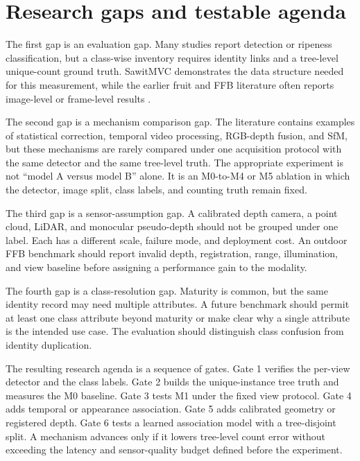 \section{Research gaps and testable agenda}
\label{sec:agenda2}

The first gap is an evaluation gap. Many studies report detection or ripeness classification, but a class-wise inventory requires identity links and a tree-level unique-count ground truth. SawitMVC demonstrates the data structure needed for this measurement, while the earlier fruit and FFB literature often reports image-level or frame-level results \cite{indriani2026sawitmvc,naftali2024palmcounter,koirala2019deepfruit}.

The second gap is a mechanism comparison gap. The literature contains examples of statistical correction, temporal video processing, RGB-depth fusion, and SfM, but these mechanisms are rarely compared under one acquisition protocol with the same detector and the same tree-level truth. The appropriate experiment is not ``model A versus model B'' alone. It is an M0-to-M4 or M5 ablation in which the detector, image split, class labels, and counting truth remain fixed.

The third gap is a sensor-assumption gap. A calibrated depth camera, a point cloud, LiDAR, and monocular pseudo-depth should not be grouped under one label. Each has a different scale, failure mode, and deployment cost. An outdoor FFB benchmark should report invalid depth, registration, range, illumination, and view baseline before assigning a performance gain to the modality.

The fourth gap is a class-resolution gap. Maturity is common, but the same identity record may need multiple attributes. A future benchmark should permit at least one class attribute beyond maturity or make clear why a single attribute is the intended use case. The evaluation should distinguish class confusion from identity duplication.

The resulting research agenda is a sequence of gates. Gate 1 verifies the per-view detector and the class labels. Gate 2 builds the unique-instance tree truth and measures the M0 baseline. Gate 3 tests M1 under the fixed view protocol. Gate 4 adds temporal or appearance association. Gate 5 adds calibrated geometry or registered depth. Gate 6 tests a learned association model with a tree-disjoint split. A mechanism advances only if it lowers tree-level count error without exceeding the latency and sensor-quality budget defined before the experiment.

